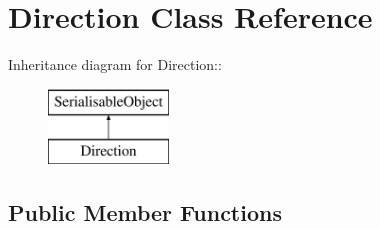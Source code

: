 \hypertarget{classDirection}{
\section{Direction Class Reference}
\label{classDirection}
}
Inheritance diagram for Direction::\begin{figure}[H]
\begin{center}
\leavevmode
\includegraphics[height=2cm]{classDirection}
\end{center}
\end{figure}
\subsection*{Public Member Functions}
